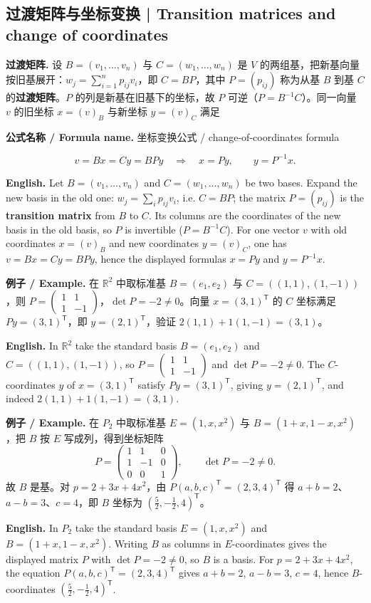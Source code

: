 \documentclass[UTF8,11pt,a4paper]{ctexart}
\newcommand{\EN}[1]{\par\noindent\textbf{English.} #1\par}
\newcommand{\FORMULA}[2]{\par\noindent\textbf{公式名称 / Formula name.} #1 / #2\par}
\newcommand{\EX}[2]{\par\noindent\textbf{例子 / Example.} #1\par\EN{#2}}
\begin{document}
\subsection{过渡矩阵与坐标变换 | Transition matrices and change of coordinates}
\noindent\textbf{过渡矩阵.} 设 $B=(v_1,\dots,v_n)$ 与 $C=(w_1,\dots,w_n)$ 是 $V$ 的两组基，把新基向量按旧基展开：$w_j=\sum_{i=1}^n p_{ij}v_i$，即 $C=BP$，其中 $P=(p_{ij})$ 称为从基 $B$ 到基 $C$ 的\textbf{过渡矩阵}。$P$ 的列是新基在旧基下的坐标，故 $P$ 可逆（$P=B^{-1}C$）。同一向量 $v$ 的旧坐标 $x=(v)_B$ 与新坐标 $y=(v)_C$ 满足
\FORMULA{坐标变换公式}{change-of-coordinates formula}
\[
v=Bx=Cy=BPy\quad\Longrightarrow\quad x=Py,\qquad y=P^{-1}x.
\]
\EN{Let $B=(v_1,\dots,v_n)$ and $C=(w_1,\dots,w_n)$ be two bases. Expand the new basis in the old one: $w_j=\sum_i p_{ij}v_i$, i.e. $C=BP$; the matrix $P=(p_{ij})$ is the \textbf{transition matrix} from $B$ to $C$. Its columns are the coordinates of the new basis in the old basis, so $P$ is invertible ($P=B^{-1}C$). For one vector $v$ with old coordinates $x=(v)_B$ and new coordinates $y=(v)_C$, one has $v=Bx=Cy=BPy$, hence the displayed formulas $x=Py$ and $y=P^{-1}x$.}
\EX{在 $\mathbb R^2$ 中取标准基 $B=(e_1,e_2)$ 与 $C=((1,1),(1,-1))$，则 $P=\begin{pmatrix}1&1\\1&-1\end{pmatrix}$，$\det P=-2\ne0$。向量 $x=(3,1)^{\mathsf T}$ 的 $C$ 坐标满足 $P y=(3,1)^{\mathsf T}$，即 $y=(2,1)^{\mathsf T}$，验证 $2(1,1)+1(1,-1)=(3,1)$。}{In $\mathbb R^2$ take the standard basis $B=(e_1,e_2)$ and $C=((1,1),(1,-1))$, so $P=\begin{pmatrix}1&1\\1&-1\end{pmatrix}$ and $\det P=-2\ne0$. The $C$-coordinates $y$ of $x=(3,1)^{\mathsf T}$ satisfy $Py=(3,1)^{\mathsf T}$, giving $y=(2,1)^{\mathsf T}$, and indeed $2(1,1)+1(1,-1)=(3,1)$.}
\EX{在 $P_2$ 中取标准基 $E=(1,x,x^2)$ 与 $B=(1+x,1-x,x^2)$，把 $B$ 按 $E$ 写成列，得到坐标矩阵
\[
P=\begin{pmatrix}1&1&0\\1&-1&0\\0&0&1\end{pmatrix},\qquad \det P=-2\ne0.
\]
故 $B$ 是基。对 $p=2+3x+4x^2$，由 $P(a,b,c)^{\mathsf T}=(2,3,4)^{\mathsf T}$ 得 $a+b=2$、$a-b=3$、$c=4$，即 $B$ 坐标为 $(\frac52,-\frac12,4)^{\mathsf T}$。}{In $P_2$ take the standard basis $E=(1,x,x^2)$ and $B=(1+x,1-x,x^2)$. Writing $B$ as columns in $E$-coordinates gives the displayed matrix $P$ with $\det P=-2\ne0$, so $B$ is a basis. For $p=2+3x+4x^2$, the equation $P(a,b,c)^{\mathsf T}=(2,3,4)^{\mathsf T}$ gives $a+b=2$, $a-b=3$, $c=4$, hence $B$-coordinates $(\frac52,-\frac12,4)^{\mathsf T}$.}
\end{document}
